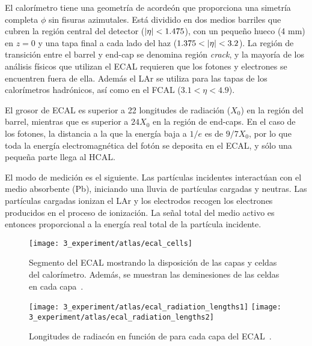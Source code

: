 El calorímetro tiene una geometría de acordeón que proporciona una simetría completa \(\phi\) sin fisuras azimutales.
Está dividido en dos medios barriles que cubren la región central del detector (\(|\eta|<1.475\)), con un pequeño hueco (4 mm) en $z = 0$ y una tapa final a cada lado del haz (\(1.375<\abseta<3.2\)).
La región de transición entre el barrel y end-cap se denomina región \textit{crack}, y la mayoría de los análisis físicos que utilizan el \ac{ECAL} requieren que los fotones y electrones se encuentren fuera de ella.
Además el \ac{LAr} se utiliza para las tapas de los calorímetros hadrónicos, así como en el \acf{FCAL} ($3.1 < \eta < 4.9$).

El grosor de \ac{ECAL} es superior a 22 longitudes de radiación (\(X_0\)) en la región del barrel, mientras que es superior a \(24 X_0\) en la región de end-caps. En el caso de los fotones, la distancia a la que la energía baja a \(1/e\) es de \(9/7 X_0\), por lo que toda la energía electromagnética del fotón se deposita en el \ac{ECAL}, y sólo una pequeña parte llega al \ac{HCAL}.

El modo de medición es el siguiente. Las partículas incidentes interactúan con el medio absorbente (Pb), iniciando una lluvia de partículas cargadas y neutras. Las partículas cargadas ionizan el \ac{LAr} y los electrodos recogen los electrones producidos en el proceso de ionización. La señal total del medio activo es entonces proporcional a la energía real total de la partícula incidente.

\begin{figure}[ht!]
    \centering
    \texttt{[image: 3\_experiment/atlas/ecal\_cells]}
    \caption{Segmento del \ac{ECAL} mostrando la disposici\'on de las capas y celdas del calor\'imetro. Adem\'as, se muestran las deminesiones de las celdas en cada capa~\cite{ATLAS}.}
    \label{fig:atlas:atlas:cals:ecal:ecal_cells}
\end{figure}

\begin{figure}[ht!]
    \centering
    \texttt{[image: 3\_experiment/atlas/ecal\_radiation\_lengths1]}
    \texttt{[image: 3\_experiment/atlas/ecal\_radiation\_lengths2]}
    \caption{Longitudes de radiac\'on en funci\'on de \abseta para cada capa del \ac{ECAL}~\cite{ATLAS}.}
    \label{fig:atlas:atlas:cals:ecal:ecal_radiation_length}
\end{figure}

